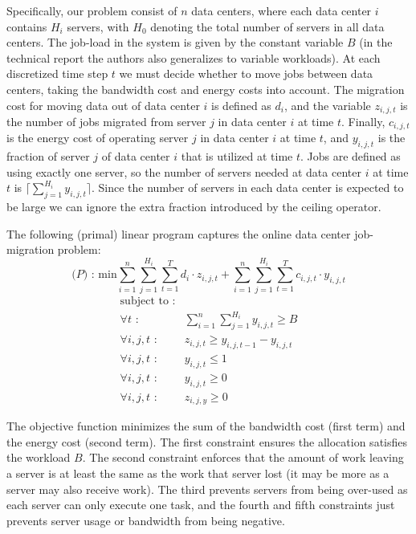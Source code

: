 Specifically, our problem consist of $n$ data centers, where each data center $i$ contains $H_i$ servers, with $H_0$ denoting the total number of servers in all data centers.
The job-load in the system is given by the constant variable $B$ (in the technical report the authors also generalizes to variable workloads).
At each discretized time step $t$ we must decide whether to move jobs between data centers, taking the bandwidth cost and energy costs into account.
The migration cost for moving data out of data center $i$ is defined as $d_i$, and the variable $z_{i,j,t}$ is the number of jobs migrated from server $j$ in data center $i$ at time $t$.
Finally, $c_{i,j,t}$ is the energy cost of operating server $j$ in data center $i$ at time $t$, and $y_{i,j,t}$ is the fraction of server $j$ of data center $i$ that is utilized at time $t$.
Jobs are defined as using exactly one server, so the number of servers needed at data center $i$ at time $t$ is $\lceil \sum^{H_i}_{j=1}y_{i,j,t} \rceil$.
Since the number of servers in each data center is expected to be large we can ignore the extra fraction introduced by the ceiling operator.

The following (primal) linear program captures the online data center job-migration problem:
\[
\textrm{($P$) : min}  \sum^n_{i=1}\sum^{H_i}_{j=1}\sum^{T}_{t=1}d_{i} \cdot z_{i,j,t} + \sum^{n}_{i=1}\sum^{H_{i}}_{j=1}\sum^{T}_{t=1} c_{i,j,t} \cdot y_{i,j,t}
\]
\[
	\begin{array}{rc}
	\textrm{subject to :} & \\
		\forall t \textrm{ :} & \sum^n_{i=1}\sum^{H_i}_{j=1}y_{i,j,t} \geq B \\
		\forall i,j,t \textrm{ :}	    & z_{i,j,t} \geq y_{i,j,t-1} - y_{i,j,t} \\
		\forall i,j,t \textrm{ :}	    & y_{i,j,t} \leq 1 \\
		\forall i,j,t \textrm{ :}	    & y_{i,j,t} \geq 0 \\
		\forall i,j,t \textrm{ :}	    & z_{i,j,y} \geq 0
	\end{array}
\]

The objective function minimizes the sum of the bandwidth cost (first term) and the energy cost (second term).
The first constraint ensures the allocation satisfies the workload $B$.
The second constraint enforces that the amount of work leaving a server is at least the same as the work that server lost (it may be more as a server may also receive work).
The third prevents servers from being over-used as each server can only execute one task, and the fourth and fifth constraints just prevents server usage or bandwidth from being negative.

